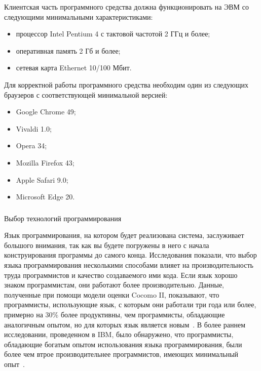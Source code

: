 Клиентская часть программного средства должна функционировать на ЭВМ со следующими минимальными характеристиками:

\begin{itemize}
	\item процессор Intel Pentium 4 с тактовой частотой 2 ГГц и более;
	\item оперативная память 2 Гб и более;
	\item сетевая карта Ethernet 10/100 Мбит.
\end{itemize}

Для корректной работы программного средства необходим один из следующих браузеров с соответствующей минимальной версией:

\begin{itemize}
	\item Google Chrome 49;
	\item Vivaldi 1.0;
	\item Opera 34;
	\item Mozilla Firefox 43;
	\item Apple Safari 9.0;
	\item Microsoft Edge 20.
\end{itemize}

\subsubsection{} Выбор технологий программирования
\label{sec:analysis:specification:language}

Язык программирования, на котором будет реализована система, заслуживает большого внимания, так как вы будете погружены в него с начала конструирования программы до самого конца. Исследования показали, что выбор языка программирования несколькими способами влияет на производительность труда программистов и качество создаваемого ими кода. Если язык хорошо знаком программистам, они работают более производительно. Данные, полученные при помощи модели оценки Cocomo II, показывают, что программисты, использующие язык, с которым они работали три года или более, примерно на 30\% более продуктивны, чем программисты, обладающие аналогичным опытом, но для которых язык является новым~\cite{software_cost_estimation}. В более раннем исследовании, проведенном в IBM, было обнаружено, что программисты, обладающие богатым опытом использования языка программирования, были более чем втрое производительнее программистов, имеющих минимальный опыт~\cite{method_of_programming_measurement_and_estimation}.

